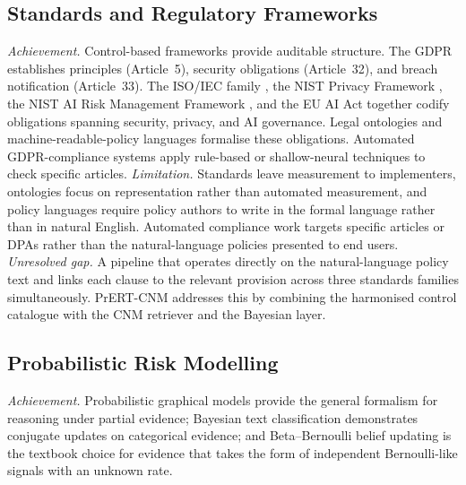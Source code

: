 \documentclass[final,3p,times,twocolumn]{elsarticle}
\begin{document}
	\subsection{Standards and Regulatory Frameworks}
	\emph{Achievement.} Control-based frameworks provide auditable structure. The GDPR
	\citep{gdpr2016} establishes principles (Article~5), security obligations (Article~32),
	and breach notification (Article~33). The ISO/IEC family \citep{iso27001_2022,iso27002_2022,iso27005_2022,iso27018_2019,iso27701_2019,iso29100_2011,iso29151_2017,iso15944_12_2020},
	the NIST Privacy Framework \citep{nist_pf_2020}, the NIST AI Risk Management Framework
	\citep{nist_aiRMF_2023}, and the EU AI Act \citep{eu_ai_act_2024} together
	codify obligations spanning security, privacy, and AI governance. Legal ontologies
	\citep{palmirani2018pronto,novikova2025privacyrisks} and machine-readable-policy
	languages \citep{cranor2002p3p,ashley2003epal,gerl2018lpl,pardo2019pilot} formalise
	these obligations. Automated GDPR-compliance systems \citep{amaral2021gdprnn} apply
	rule-based or shallow-neural techniques to check specific articles. \emph{Limitation.}
	Standards leave measurement to implementers, ontologies focus on
	representation rather than automated measurement, and policy languages require
	policy authors to write in the formal language rather than in natural English.
	Automated compliance work targets specific articles or DPAs rather than the
	natural-language policies presented to end users. \emph{Unresolved gap.} A
	pipeline that operates directly on the natural-language policy text and links
	each clause to the relevant provision across three standards families
	simultaneously. PrERT-CNM addresses this by combining the harmonised control catalogue
	with the CNM retriever and the Bayesian layer.

	\subsection{Probabilistic Risk Modelling}

    
	\emph{Achievement.} 
    Probabilistic graphical models \citep{pearl1988probabilistic,koller2009pgm}
	provide the general formalism for reasoning under partial evidence; Bayesian
	text classification \citep{domingos1997optimality} demonstrates conjugate updates
	on categorical evidence; and Beta--Bernoulli belief updating \citep{gelman2013bayesian}
	is the textbook choice for evidence that takes the form of independent
	Bernoulli-like signals with an unknown rate. 
    
\end{document}
